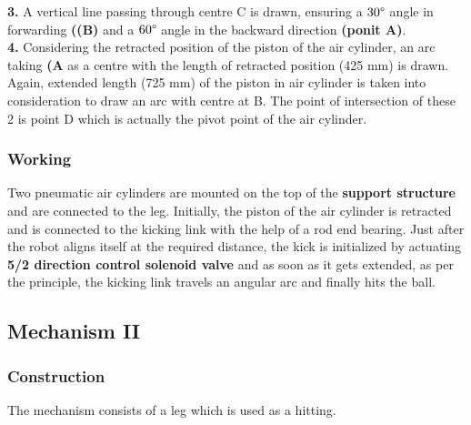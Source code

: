                 \textbf{3.} A vertical line passing through centre C is drawn, ensuring a $30 \degree$ angle in forwarding \textbf{((B)} and
                            a $60 \degree$ angle in the backward direction \textbf{(ponit A)}.                                                   \\    
                \textbf{4.} Considering the retracted position of the piston of the air cylinder, an arc taking \textbf{(A} as a centre with
                            the length of retracted position (425 mm) is drawn. Again, extended length (725 mm) of the piston in air cylinder
                            is taken into consideration to draw an arc with centre at B. The point of intersection of these 2 is point D which
                            is actually the pivot point of the air cylinder.                                                                     \\
    

        \subsubsection{Working}
            Two pneumatic air cylinders are mounted on the top of the \textbf{support structure} and are connected to the leg. Initially, the 
            piston of the air cylinder is retracted and is connected to the kicking link with the help of a rod end bearing. Just after the robot
            aligns itself at the required distance, the kick is initialized by actuating \textbf{5/2 direction control solenoid valve} and as soon
            as it gets extended, as per the principle, the kicking link travels an angular arc and finally hits the ball.

    \subsection{Mechanism II}
    
        \subsubsection{Construction}
            The mechanism consists of a leg which is used as a hitting.

